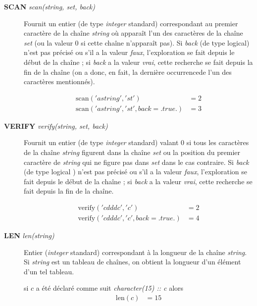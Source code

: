 \documentclass[a4paper,twoside]{article}
\begin{document}
\begin{description}
\item[\textbf{SCAN} \emph{scan(string, set, back)}] Fournit un entier (de type \emph{integer} standard) correspondant au premier caractère de la chaîne \emph{string}  où apparaît l'un des caractères de la chaîne \emph{set}  (ou la valeur 0 si cette chaîne n'apparaît pas). Si \emph{back}  (de type logical) n'est pas précisé ou s'il a la valeur \emph{faux}, l'exploration se fait depuis le début de la chaîne ; si \emph{back} a la valeur \emph{vrai}, cette recherche se fait depuis la fin de la chaîne (on a donc, en fait, la dernière \og occurrence\fg de l'un des caractères mentionnés). 
\begin{exemple}
\begin{align}
\mathrm{scan}('astring','st')  &= 2\\
\mathrm{scan}('astring','st',back=.true.)  &= 3
\end{align}
\end{exemple}

\item[\textbf{VERIFY} \emph{verify(string, set, back)}] Fournit un entier (de type \emph{integer} standard) valant 0 si tous les caractères de la chaîne \emph{string} figurent dans la chaîne \emph{set} ou la position du premier caractère de \emph{string} qui ne figure pas dans \emph{set} dans le cas contraire. Si \emph{back} (de type logical ) n'est pas précisé ou s'il a la valeur \emph{faux}, l'exploration se fait depuis le début de la chaîne ; si \emph{back} a la valeur \emph{vrai}, cette recherche se fait depuis la fin de la chaîne.
\begin{exemple}
\begin{align}
\mathrm{verify}('cdddc','c')  &= 2\\
\mathrm{verify}('cdddc','c',back=.true.)  &= 4
\end{align}
\end{exemple}

\item[\textbf{LEN} \emph{len(string)}] Entier (\emph{integer} standard) correspondant à la longueur de la chaîne \emph{string}. Si \emph{string} est un tableau de chaînes, on obtient la longueur d'un élément d'un tel tableau. 
\begin{exemple}
si $c$ a été déclaré comme suit \emph{character(15) :: c} alors 
\begin{align}
\mathrm{len}(c)  &= 15
\end{align}
\end{exemple}




\end{description}
\end{document}
